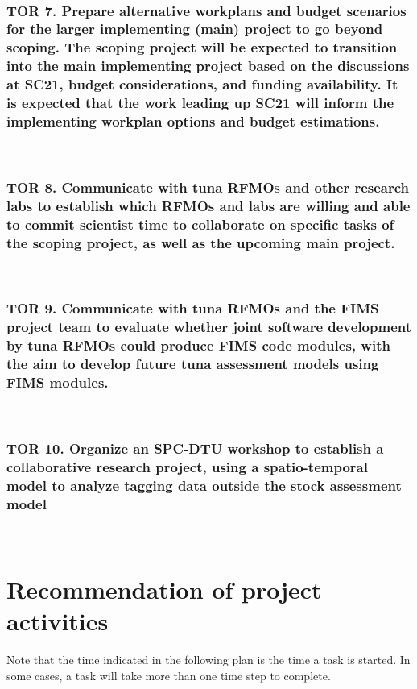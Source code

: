 \documentclass{SCreport}
\begin{document}
~

\subsubsection{TOR 7. Prepare alternative workplans and budget scenarios for the
  larger implementing (main) project to go beyond scoping. The scoping project
  will be expected to transition into the main implementing project based on the
  discussions at SC21, budget considerations, and funding availability. It is
  expected that the work leading up SC21 will inform the implementing workplan
  options and budget estimations.}

~

\newpage

\subsubsection{TOR 8. Communicate with tuna RFMOs and other research labs to
  establish which RFMOs and labs are willing and able to commit scientist time
  to collaborate on specific tasks of the scoping project, as well as the
  upcoming main project.}

~

\subsubsection{TOR 9. Communicate with tuna RFMOs and the FIMS project team to
  evaluate whether joint software development by tuna RFMOs could produce FIMS
  code modules, with the aim to develop future tuna assessment models using FIMS
  modules.}

~

\hypertarget{link:tagging-index}{}
\subsubsection{TOR 10. Organize an SPC-DTU workshop to establish a collaborative
  research project, using a spatio-temporal model to analyze tagging data
  outside the stock assessment model}

~

\section{Recommendation of project activities}

Note that the time indicated in the following plan is the time a task is
started. In some cases, a task will take more than one time step to complete.
\end{document}
